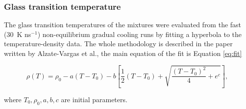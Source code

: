 \subsubsection{Glass transition temperature}
The glass transition temperatures of the mixtures were evaluated from the fast (30~K ns$^{-1}$) non-equilibrium gradual cooling runs by fitting a hyperbola to the temperature-density data. The whole methodology is described in the paper written by Alzate-Vargas et al.\cite{alzate-vargas_uncertainties_2018}, the main equation of the fit is Equation \ref{eq:fit}

\begin{equation}\label{eq:fit}
	\rho(T)=\rho_0-a\left(T-T_0\right)-b\left[\frac{1}{2}\left(T-T_0\right)+\sqrt{\frac{\left(T-T_0\right)^2}{4}+e^c}\right],
\end{equation}

where $T_0, \rho_0, a, b, c$ are initial parameters.

